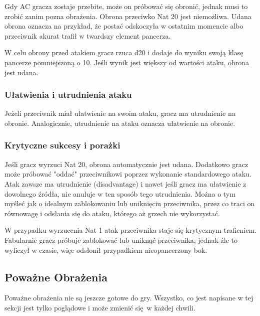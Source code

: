 Gdy AC gracza zostaje przebite, może on próbować się obronić, jednak musi to
zrobić zanim pozna obrażenia. Obrona przeciwko Nat 20 jest niemożliwa. Udana
obrona oznacza na przykład, że postać odskoczyła  w ostatnim momencie albo
przeciwnik akurat trafił w twardszy element pancerza.

W celu obrony przed atakiem gracz rzuca d20 i dodaje do wyniku swoją klasę
pancerze pomniejszoną o 10. Jeśli wynik jest większy od wartości ataku, obrona
jest udana.

\subsubsection{Ułatwienia i utrudnienia ataku}
Jeżeli przeciwnik miał ułatwienie na swoim ataku, gracz ma utrudnienie na
obronie. Analogicznie, utrudnienie na ataku oznacza ułatwienie na obronie.

\subsubsection{Krytyczne sukcesy i porażki}
Jeśli gracz wyrzuci Nat 20, obrona automatycznie jest udana. Dodatkowo gracz
może próbować "oddać" przeciwnikowi poprzez wykonanie standardowego ataku. Atak
zawsze ma utrudnienie (disadvantage) i nawet jeśli gracz ma ułatwienie z
dowolnego źródła, nie anuluje w ten sposób tego utrudnienia. Można o tym myśleć
jak o idealnym zablokowaniu lub uniknięciu przeciwnika, przez co traci on
równowagę i odsłania się do ataku, którego aż grzech nie wykorzystać.

W przypadku wyrzucenia Nat 1 atak przeciwnika staje się krytycznym trafieniem.
Fabularnie gracz próbuje zablokować lub uniknąć przeciwnika, jednak źle to
wyliczył w czasie, więc odsłonił przypadkiem nieopancerzony bok.

\subsection{Poważne Obrażenia}

\begin{tcolorbox}[width=\textwidth,colback={gray!15},title={Work in Progress}]
Poważne obrażenia nie są jeszcze gotowe do gry. Wszystko, co jest napisane w tej
sekcji jest tylko poglądowe i może zmienić się w każdej chwili.
\end{tcolorbox}


